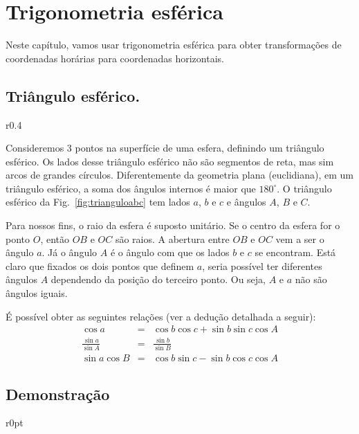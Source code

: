 \chapter{Trigonometria esférica}

Neste capítulo, vamos usar trigonometria esférica para obter transformações de coordenadas horárias para coordenadas horizontais. 

\section{Triângulo esférico.}

\begin{wrapfigure}{r}{0.4\textwidth}
\centering

\caption{Um triângulo esférico}
\label{fig:trianguloabc}
\end{wrapfigure}
%
Consideremos 3 pontos na superfície de uma esfera, definindo um triângulo esférico. Os lados desse triângulo esférico não são segmentos de reta, mas sim arcos de grandes círculos. Diferentemente da geometria plana (euclidiana), em um triângulo esférico, a soma dos ângulos internos é maior que $180^{\circ}$. O triângulo esférico da Fig.~\ref{fig:trianguloabc} tem lados $a$, $b$ e $c$ e ângulos $A$, $B$ e $C$.

Para nossos fins, o raio da esfera é suposto unitário. Se o centro da esfera for o ponto $O$, então $OB$ e $OC$ são raios. A abertura entre $OB$ e $OC$ vem a ser o ângulo $a$. Já o ângulo $A$ é o ângulo com que os lados $b$ e $c$ se encontram. Está claro que fixados os dois pontos que definem $a$, seria possível ter diferentes ângulos $A$ dependendo da posição do terceiro ponto. Ou seja, $A$ e $a$ não são ângulos iguais.

É possível obter as seguintes relações (ver a dedução detalhada a seguir):
%
\begin{eqnarray}
\cos a &=& \cos b \cos c + \sin b \sin c \cos A        \label{tri1} \\[0.7em]
\frac{\sin a}{\sin A} &=& \frac{\sin b}{\sin B}        \label{tri2} \\[0.7em] 
\sin a \cos B &=& \cos b \sin c - \sin b \cos c \cos A \label{tri3}
\end{eqnarray}

\section*{Demonstração}

\begin{wrapfigure}{r}{0pt}
\centering

\caption{Um triângulo esférico}
\label{fig:triangulo}
\end{wrapfigure}

